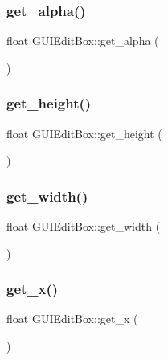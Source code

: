 \subsubsection{\texorpdfstring{get\+\_\+alpha()}{get\_alpha()}}
{\footnotesize\ttfamily float G\+U\+I\+Edit\+Box\+::get\+\_\+alpha (\begin{DoxyParamCaption}{ }\end{DoxyParamCaption})}

\hypertarget{class_g_u_i_edit_box_a4161c41286830b059e7dac7245b521fd}{}\label{class_g_u_i_edit_box_a4161c41286830b059e7dac7245b521fd} 
\subsubsection{\texorpdfstring{get\+\_\+height()}{get\_height()}}
{\footnotesize\ttfamily float G\+U\+I\+Edit\+Box\+::get\+\_\+height (\begin{DoxyParamCaption}{ }\end{DoxyParamCaption})}

\hypertarget{class_g_u_i_edit_box_a4cbbaeba736012561070ea18219f0e36}{}\label{class_g_u_i_edit_box_a4cbbaeba736012561070ea18219f0e36} 
\subsubsection{\texorpdfstring{get\+\_\+width()}{get\_width()}}
{\footnotesize\ttfamily float G\+U\+I\+Edit\+Box\+::get\+\_\+width (\begin{DoxyParamCaption}{ }\end{DoxyParamCaption})}

\hypertarget{class_g_u_i_edit_box_ab0b3ca6eae9ba38ebf7acf138d5da169}{}\label{class_g_u_i_edit_box_ab0b3ca6eae9ba38ebf7acf138d5da169} 
\subsubsection{\texorpdfstring{get\+\_\+x()}{get\_x()}}
{\footnotesize\ttfamily float G\+U\+I\+Edit\+Box\+::get\+\_\+x (\begin{DoxyParamCaption}{ }\end{DoxyParamCaption})}

